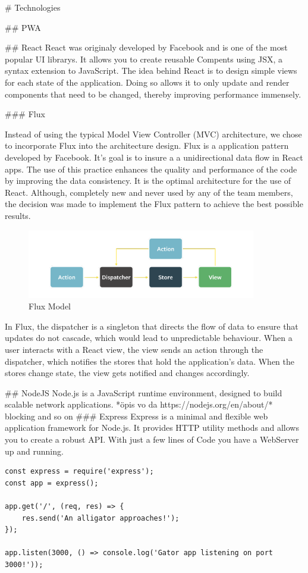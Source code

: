 \begin{markdown}
# Technologies



## PWA

## React
React\cite{React} was originaly developed by Facebook and is one of the most popular UI librarys. It allows you to create reusable Compents using JSX, a syntax extension to JavaScript.
The idea behind React is to design simple views for each state of the application. Doing so allows it to only update and render components that need to be changed, thereby improving performance immensely.


### Flux

Instead of using the typical Model View Controller (MVC) architecture, we chose to incorporate Flux\cite{OurReadme} into the architecture design. Flux is a application pattern developed by Facebook. It's goal is to insure a a unidirectional data flow in React apps. The use of this practice enhances the quality and performance of the code by improving the data consistency. It is the optimal architecture for the use of React. Although, completely new and never used by any of the team members, the decision was made to implement the Flux pattern to achieve the best possible results.

\begin{figure}[H]
  \includegraphics[width=10cm, center]{./assets/flux.png}
  \caption{Flux Model{\cite{FluxModel}}}
\end{figure}




In Flux, the dispatcher is a singleton that directs the flow of data to ensure that updates do not cascade, which would lead to unpredictable behaviour. When a user interacts with a React view, the view sends an action through the dispatcher, which notifies the stores that hold the application’s data. When the stores change state, the view gets notified and changes accordingly.

## NodeJS
Node.js is a JavaScript runtime environment, designed to build scalable network applications\cite{Node}.
*öpis vo da https://nodejs.org/en/about/* blocking and so on
### Express
Express\cite{Express} is a minimal and flexible web application framework for Node.js. It provides HTTP utility methods and allows you to create a robust API.
With just a few lines of Code you have a WebServer up and running.

\begin{lstlisting}
const express = require('express');
const app = express();

app.get('/', (req, res) => {
    res.send('An alligator approaches!');
});

app.listen(3000, () => console.log('Gator app listening on port 3000!'));
\end{lstlisting}

\end{markdown}
